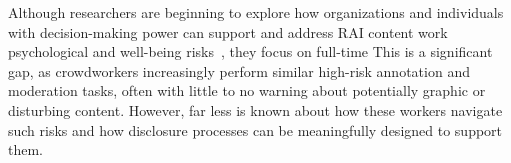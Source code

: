 Although researchers are beginning to explore how organizations and individuals with decision-making power can support and address RAI content work psychological and well-being risks~\cite{qian2025aura, steiger_psychological_2021, bharucha2023content}, they focus on full-time  This is a significant gap, as crowdworkers increasingly perform similar high-risk annotation and moderation tasks, often with little to no warning about potentially graphic or disturbing content. However, far less is known about how these workers navigate such risks and how disclosure processes can be meaningfully designed to support them. %




